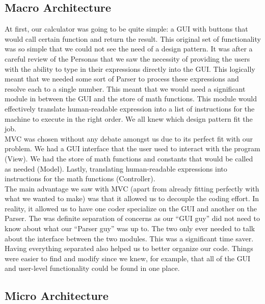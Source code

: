 \documentclass[a4paper, 12pt]{article}
\begin{document}
\subsection{Macro Architecture}

At first, our calculator was going to be quite simple: a GUI with buttons that would call certain function and return the result. This original set of functionality was so simple that we could not see the need of a design pattern. It was after a careful review of the Personas that we saw the necessity of providing the users with the ability to type in their expressions directly into the GUI. This logically meant that we needed some sort of Parser to process these expressions and resolve each to a single number. This meant that we would need a significant module in between the GUI and the store of math functions. This module would effectively translate human-readable expression into a list of instructions for the machine to execute in the right order. We all knew which design pattern fit the job.
\\

MVC was chosen without any debate amongst us due to its perfect fit with our problem. We had a GUI interface that the user used to interact with the program (View). We had the store of math functions and constants that would be called as needed (Model). Lastly, translating human-readable expressions into instructions for the math functions (Controller).
\\

The main advantage we saw with MVC (apart from already fitting perfectly with what we wanted to make) was that it allowed us to decouple the coding effort. In reality, it allowed us to have one coder specialize on the GUI and another on the Parser. The was definite separation of concerns as our “GUI guy” did not need to know about what our “Parser guy” was up to. The two only ever needed to talk about the interface between the two modules. This was a significant time saver.
\\

Having everything separated also helped us to better organize our code. Things were easier to find and modify since we knew, for example, that all of the GUI and user-level functionality could be found in one place.


\subsection{Micro Architecture}
\end{document}

